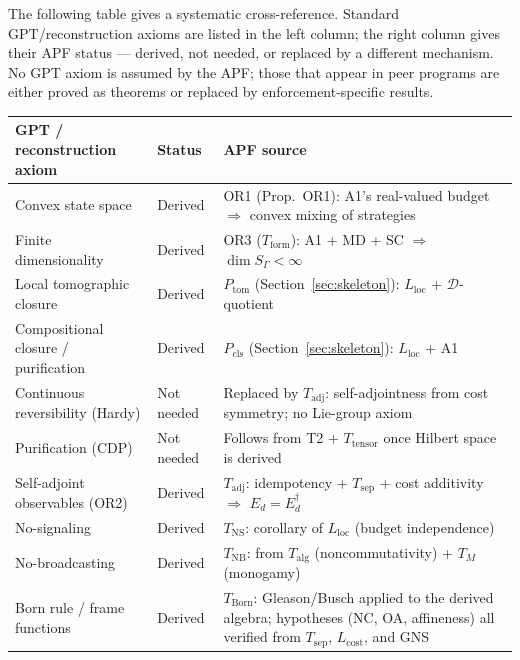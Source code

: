\documentclass[11pt]{article}
\theoremstyle{remark}
\begin{document}
The following table gives a systematic cross-reference.  Standard GPT/reconstruction axioms are listed in the left column; the right column gives their APF status --- derived, not needed, or replaced by a different mechanism.  No GPT axiom is assumed by the APF; those that appear in peer programs are either proved as theorems or replaced by enforcement-specific results.

\smallskip
\begin{center}
\smallskip
\footnotesize
\begin{tabular}{@{}p{4.0cm}p{1.4cm}p{7.2cm}@{}}
\textbf{GPT / reconstruction axiom} & \textbf{Status} & \textbf{APF source} \\[2pt]
\hline\noalign{\smallskip}
Convex state space & Derived & OR1 (Prop.~OR1): A1's real-valued budget $\Rightarrow$ convex mixing of strategies \\[3pt]
Finite dimensionality & Derived & OR3 ($T_{\mathrm{form}}$): A1 + MD + SC $\Rightarrow$ $\dim S_\Gamma < \infty$ \\[3pt]
Local tomographic closure & Derived & $P_{\mathrm{tom}}$ (Section~\ref{sec:skeleton}): $L_{\mathrm{loc}}$ + $\mathcal{D}$-quotient \\[3pt]
Compositional closure / purification & Derived & $P_{\mathrm{cls}}$ (Section~\ref{sec:skeleton}): $L_{\mathrm{loc}}$ + A1 \\[3pt]
Continuous reversibility (Hardy) & Not needed & Replaced by $T_{\mathrm{adj}}$: self-adjointness from cost symmetry; no Lie-group axiom \\[3pt]
Purification (CDP) & Not needed & Follows from T2 + $T_{\mathrm{tensor}}$ once Hilbert space is derived \\[3pt]
Self-adjoint observables (OR2) & Derived & $T_{\mathrm{adj}}$: idempotency + $T_{\mathrm{sep}}$ + cost additivity $\Rightarrow$ $E_d = E_d^\dagger$ \\[3pt]
No-signaling & Derived & $T_{\mathrm{NS}}$: corollary of $L_{\mathrm{loc}}$ (budget independence) \\[3pt]
No-broadcasting & Derived & $T_{\mathrm{NB}}$: from $T_{\mathrm{alg}}$ (noncommutativity) + $T_M$ (monogamy) \\[3pt]
Born rule / frame functions & Derived & $T_{\mathrm{Born}}$: Gleason/Busch applied to the derived algebra; hypotheses (NC, OA, affineness) all verified from $T_{\mathrm{sep}}$, $L_{\mathrm{cost}}$, and GNS \\
\end{tabular}
\label{tab:gpt_crossref}
\end{center}
\end{document}
